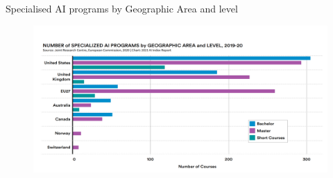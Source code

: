 {

\begin{frame}{Specialised AI programs by Geographic Area and level}

\begin{figure}
 \centering
 \includegraphics[width=1.0\textwidth]{./figures/progress-of-air-a0/outputs/drawing-v00.png}
\end{figure}

\end{frame}
}

%
%
%
%


%
%
%
%

